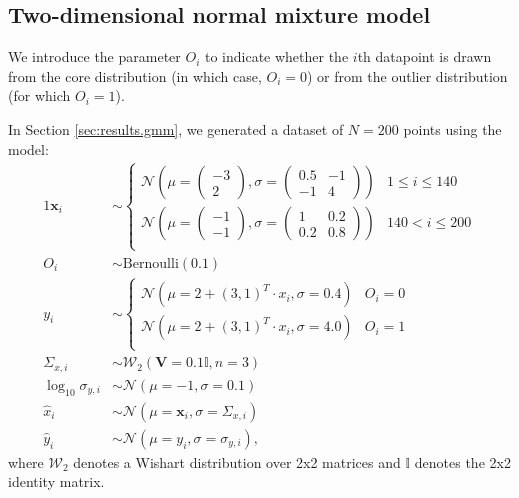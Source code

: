\documentclass[fleqn,usenatbib]{rasti}
\begin{document}
\subsection{Two-dimensional normal mixture model}
\label{sec:data-models.gmm}

We introduce the parameter $O_i$ to indicate whether the $i$th datapoint is
drawn from the core distribution (in which case, $O_i = 0$) or from the outlier
distribution (for which $O_i = 1$).

In Section \ref{sec:results.gmm}, we generated a dataset of $N = 200$ points
using the model:
\begin{alignat}{1}
    \boldsymbol{x}_i& \sim
    \begin{cases}
        \mathcal N \left(
            \mu = \begin{pmatrix} -3 \\ 2 \end{pmatrix},
            \sigma = \begin{pmatrix} 0.5 & -1 \\ -1 & 4 \end{pmatrix}
        \right) &
            1 \leqslant i \leqslant 140 \\
        \mathcal N \left(
            \mu = \begin{pmatrix} -1 \\ -1 \end{pmatrix},
            \sigma = \begin{pmatrix} 1 & 0.2 \\ 0.2 & 0.8 \end{pmatrix}
        \right) &
            140 < i \leqslant 200 \\
    \end{cases}\\
    O_i& \sim \mathrm{Bernoulli}(0.1) \\
    y_i& \sim
    \begin{cases}
        \mathcal N (\mu = 2 + (3, 1)^T \cdot x_i, \sigma = 0.4) &
            O_i = 0 \\
        \mathcal N (\mu = 2 + (3, 1)^T \cdot x_i, \sigma = 4.0) &
            O_i = 1 \\
    \end{cases}\\
    \Sigma_{x, i}& \sim \mathcal W_2 (\boldsymbol{V} = 0.1 \mathbb{I}, n = 3) \\
    \log_{10} \sigma_{y, i}& \sim \mathcal N (\mu = -1, \sigma = 0.1) \\
    \hat{x}_i& \sim \mathcal N (\mu = \boldsymbol{x}_i, \sigma = \Sigma_{x, i}) \\
    \hat{y}_i& \sim \mathcal N (\mu = y_i, \sigma = \sigma_{y, i}),
\end{alignat}
where $\mathcal W_2$ denotes a Wishart distribution over 2x2 matrices and
$\mathbb{I}$ denotes the 2x2 identity matrix.
\end{document}
